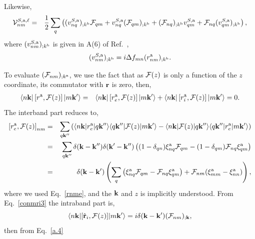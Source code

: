 \documentclass[floatfix,prb,aps,superscriptaddress,11pt,preprint]{revtex4}
\begin{document}
Likewise,
\begin{eqnarray}\label{a.3b}
{\mathbf{\cal V}}^{S,\mathrm{a},\ell}_{nm}
&=&
\frac{1}{2}\sum_q\left(
(v^{S,\mathrm{a}}_{nq})_{;k^{\mathrm{b}}}{\mathbf{\cal F}}_{qm}
+
v^{S,\mathrm{a}}_{nq}({\mathbf{\cal F}}_{qm})_{;k^{\mathrm{b}}}
+
({\mathbf{\cal F}}_{nq})_{;k^{\mathrm{b}}} v_{qm}^{S,\mathrm{a}}
+
{\mathbf{\cal F}}_{nq} (v_{qm}^{S,\mathrm{a}})_{;k^{\mathrm{b}}}
\right)
,
\end{eqnarray}
where $(v^{S,\mathrm{a}}_{nm})_{;k^{\mathrm{b}}}$ is given in A(6) of
Ref.~,
\begin{eqnarray}\label{choni.1}
(v^{S,\mathrm{a}}_{nm})_{;k^{\mathrm{b}}}=i\Delta f_{mn}
(r^{\mathrm{a}}_{nm})_{;k^{\mathrm{b}}}
.
\end{eqnarray}


To evaluate $({\mathbf{\cal F}}_{nm})_{;k^{\mathrm{a}}}$, we use the fact that as
${\mathbf{\cal F}}(z)$ is only a function of the $z$ coordinate, its commutator
with $\mathbf{r}$ is zero, then,
\begin{eqnarray}\label{a.4}
\langle n\mathbf{k} |
\left[r^{\mathrm{a}},{\mathbf{\cal F}}(z)\right]
| m\mathbf{k}' \rangle
&=&
\langle n\mathbf{k} |
\left[r_e^{\mathrm{a}},{\mathbf{\cal F}}(z)\right]
| m\mathbf{k}' \rangle
+
\langle n\mathbf{k} |
\left[r_i^{\mathrm{a}},{\mathbf{\cal F}}(z)\right]
| m\mathbf{k}' \rangle
=
 0
.
\end{eqnarray} 
The interband part reduces to,
\begin{eqnarray}\label{a.5}
\left[r_e^{\mathrm{a}},{\mathbf{\cal F}}(z)\right]_{nm}
&=&
\sum_{q\mathbf{k}''}
\left(
\langle n\mathbf{k} |
r_e^{\mathrm{a}}
| q\mathbf{k}'' \rangle
\langle q\mathbf{k}'' |
{\mathbf{\cal F}}(z)
| m\mathbf{k}' \rangle
-
\langle n\mathbf{k} |
{\mathbf{\cal F}}(z)
 | q\mathbf{k}'' \rangle
\langle q\mathbf{k}'' |
r_e^{\mathrm{a}}
| m\mathbf{k}' \rangle
\right)
\nonumber\\
&=&
\sum_{q\mathbf{k}''}
\delta(\mathbf{k}-\mathbf{k}'')
\delta(\mathbf{k}'-\mathbf{k}'')
\left(
(1-\delta_{qn})
\xi_{nq}^{\mathrm{a}}
{\mathbf{\cal F}}_{qm}
-
(1-\delta_{qm})
{\mathbf{\cal F}}_{nq}
\xi_{qm}^{\mathrm{a}}
\right)
\nonumber\\
&=&
\delta(\mathbf{k}-\mathbf{k}')
\left(
\sum_{q}
\left(
\xi_{nq}^{\mathrm{a}}
{\mathbf{\cal F}}_{qm}
-
{\mathbf{\cal F}}_{nq}
\xi_{qm}^{\mathrm{a}}
\right)
+
{\mathbf{\cal F}}_{nm}(\xi_{mm}^{\mathrm{a}}-\xi_{nn}^{\mathrm{a}})
\right)
,
\end{eqnarray}
where we used Eq.~\eqref{rnme}, and the $\mathbf{k}$ and $z$ is implicitly
understood. From Eq.~\eqref{conmri3} the intraband part is,
\begin{equation}\label{a.6}
\langle n\mathbf{k} |[\hat{\mathbf{r}}_i,{\mathbf{\cal F}}(z)]| m\mathbf{k}' \rangle
=i\delta(\mathbf{k}-\mathbf{k}')({\mathbf{\cal F}}_{nm})_{;\mathbf{k}}
,
\end{equation}
then from Eq.~\eqref{a.4}
\end{document}
